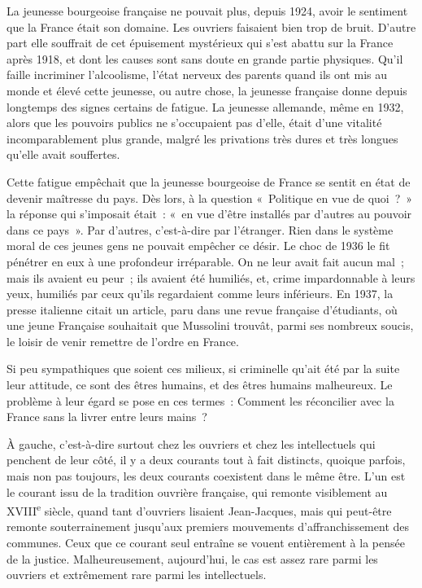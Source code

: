 \documentclass[french,twoside]{book} %
\begin{document}
La jeunesse bourgeoise française ne pouvait plus, depuis 1924, avoir le sentiment que la France était son domaine. Les ouvriers faisaient bien trop de bruit. D'autre part elle souffrait de cet épuisement mystérieux qui s'est abattu sur la France après 1918, et dont les causes sont sans doute en grande partie physiques. Qu'il faille incriminer l'alcoolisme, l'état nerveux des parents quand ils ont mis au monde et élevé cette jeunesse, ou autre chose, la jeunesse française donne depuis longtemps des signes certains de fatigue. La jeunesse allemande, même en 1932, alors que les pouvoirs publics ne s'occupaient pas d'elle, était d'une vitalité incomparablement plus grande, malgré les privations très dures et très longues qu'elle avait souffertes.\par
Cette fatigue empêchait que la jeunesse bourgeoise de France se sentit en état de devenir maîtresse du pays. Dès lors, à la question « Politique en vue de quoi ? » la réponse qui s'imposait était : « en vue d'être installés par d'autres au pouvoir dans ce pays ». Par d'autres, c'est-à-dire par l'étranger. Rien dans le système moral de ces jeunes gens ne pouvait empêcher ce désir. Le choc de 1936 le fit pénétrer en eux à une profondeur irréparable. On ne leur avait fait aucun mal ; mais ils avaient eu peur ; ils avaient été humiliés, et, crime impardonnable à leurs yeux, humiliés par ceux qu'ils regardaient comme leurs inférieurs. En 1937, la presse italienne citait un article, paru dans une revue française d'étudiants, où une jeune Française souhaitait que Mussolini trouvât, parmi ses nombreux soucis, le loisir de venir remettre de l'ordre en France.\par
Si peu sympathiques que soient ces milieux, si criminelle qu'ait été par la suite leur attitude, ce sont des êtres humains, et des êtres humains malheureux. Le problème à leur égard se pose en ces termes : Comment les réconcilier avec la France sans la livrer entre leurs mains ?\par
À gauche, c'est-à-dire surtout chez les ouvriers et chez les intellectuels qui penchent de leur côté, il y a deux courants tout à fait distincts, quoique parfois, mais non pas toujours, les deux courants coexistent dans le même être. L'un est le courant issu de la tradition ouvrière française, qui remonte visiblement au XVIII\textsuperscript{e} siècle, quand tant d'ouvriers lisaient Jean-Jacques, mais qui peut-être remonte souterrainement jusqu'aux premiers mouvements d'affranchissement des communes. Ceux que ce courant seul entraîne se vouent entièrement à la pensée de la justice. Malheureusement, aujourd'hui, le cas est assez rare parmi les ouvriers et extrêmement rare parmi les intellectuels.\par
\end{document}
